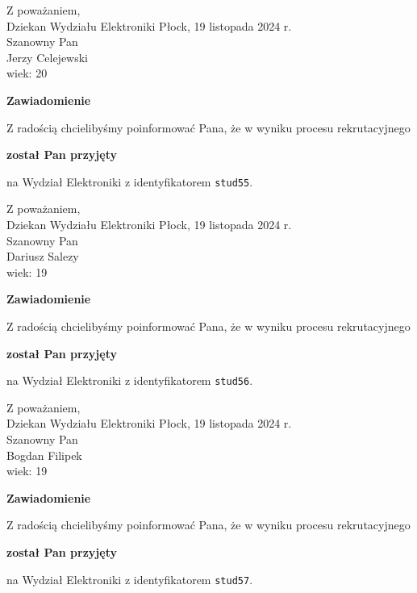 \documentclass[12pt,a4paper]{article}
\begin{document}
\noindent
Z poważaniem,\\
Dziekan
Wydziału Elektroniki
\newpage
\hfill Płock, 19 listopada 2024 r.\\ 
\noindent 
Szanowny Pan \\
Jerzy Celejewski \\
wiek: 20

\bigskip

\begin{center}
{\Large\textbf{Zawiadomienie}}
\end{center}
\bigskip
Z radością chcielibyśmy poinformować Pana, że w wyniku procesu rekrutacyjnego
\begin{center}
\textsf{\textbf{został Pan przyjęty}} 
\end{center}
na Wydział Elektroniki z identyfikatorem \verb|stud55|.
\vspace{2cm}

\noindent
Z poważaniem,\\
Dziekan
Wydziału Elektroniki
\newpage
\hfill Płock, 19 listopada 2024 r.\\ 
\noindent 
Szanowny Pan \\
Dariusz Salezy \\
wiek: 19

\bigskip

\begin{center}
{\Large\textbf{Zawiadomienie}}
\end{center}
\bigskip
Z radością chcielibyśmy poinformować Pana, że w wyniku procesu rekrutacyjnego
\begin{center}
\textsf{\textbf{został Pan przyjęty}} 
\end{center}
na Wydział Elektroniki z identyfikatorem \verb|stud56|.
\vspace{2cm}

\noindent
Z poważaniem,\\
Dziekan
Wydziału Elektroniki
\newpage
\hfill Płock, 19 listopada 2024 r.\\ 
\noindent 
Szanowny Pan \\
Bogdan Filipek \\
wiek: 19

\bigskip

\begin{center}
{\Large\textbf{Zawiadomienie}}
\end{center}
\bigskip
Z radością chcielibyśmy poinformować Pana, że w wyniku procesu rekrutacyjnego
\begin{center}
\textsf{\textbf{został Pan przyjęty}} 
\end{center}
na Wydział Elektroniki z identyfikatorem \verb|stud57|.
\vspace{2cm}
\end{document}
